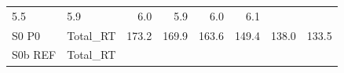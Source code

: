 \documentclass[]{article}
\begin{document}
\begin{longtable}[]{@{}llrrrrrr@{}}
\begin{minipage}[t]{0.09\columnwidth}
5.5\strut
\end{minipage} & \begin{minipage}[t]{0.09\columnwidth}\raggedleft\strut
5.9\strut
\end{minipage} & \begin{minipage}[t]{0.09\columnwidth}\raggedleft\strut
6.0\strut
\end{minipage} & \begin{minipage}[t]{0.09\columnwidth}\raggedleft\strut
5.9\strut
\end{minipage} & \begin{minipage}[t]{0.09\columnwidth}\raggedleft\strut
6.0\strut
\end{minipage} & \begin{minipage}[t]{0.09\columnwidth}\raggedleft\strut
6.1\strut
\end{minipage}\tabularnewline
\begin{minipage}[t]{0.14\columnwidth}\raggedright\strut
S0 P0\strut
\end{minipage} & \begin{minipage}[t]{0.13\columnwidth}\raggedright\strut
Total\_RT\strut
\end{minipage} & \begin{minipage}[t]{0.09\columnwidth}\raggedleft\strut
173.2\strut
\end{minipage} & \begin{minipage}[t]{0.09\columnwidth}\raggedleft\strut
169.9\strut
\end{minipage} & \begin{minipage}[t]{0.09\columnwidth}\raggedleft\strut
163.6\strut
\end{minipage} & \begin{minipage}[t]{0.09\columnwidth}\raggedleft\strut
149.4\strut
\end{minipage} & \begin{minipage}[t]{0.09\columnwidth}\raggedleft\strut
138.0\strut
\end{minipage} & \begin{minipage}[t]{0.09\columnwidth}\raggedleft\strut
133.5\strut
\end{minipage}\tabularnewline
\begin{minipage}[t]{0.14\columnwidth}\raggedright\strut
S0b REF\strut
\end{minipage} & \begin{minipage}[t]{0.13\columnwidth}\raggedright\strut
Total\_RT\strut
\end{minipage} & \begin{minipage}[t]{0.09\columnwidth}\raggedleft\strut

\end{minipage}
\end{longtable}
\end{document}
